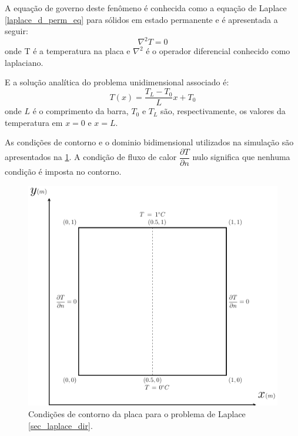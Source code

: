 A equação de governo deste fenômeno é conhecida como a equação de Laplace \eqref{laplace_d_perm_eq} para sólidos em estado permanente e é apresentada a seguir:
\begin{equation}
    \nabla^2 T = 0
    \label{laplace_d_perm_eq} 
\end{equation}
onde T é a temperatura na placa e $\nabla^2$ é o operador diferencial conhecido como laplaciano.

E a solução analítica do problema unidimensional associado é:
\begin{equation}
    T(x) = \dfrac{T_L-T_0}{L} x + T_0
    \label{laplace_d_sol}
\end{equation}
onde $L$ é o comprimento da barra, $T_0$ e $T_L$ são, respectivamente, os valores da temperatura em $x=0$ e $x=L$.

As condições de contorno e o dominio bidimensional utilizados na simulação são apresentados na \ref{laplace_d_bc}. A condição de fluxo de calor $\dfrac{\partial T}{\partial n}$ nulo significa que nenhuma condição é imposta no contorno.

\begin{figure}[H]
    \centering
    \includegraphics[width=.7\linewidth]{figures/laplace_dirichlet_boundary_conditions.pdf}
    \caption{Condições de contorno da placa para o problema de Laplace \ref{sec_laplace_dir}.}
    \label{laplace_d_bc}
\end{figure}


